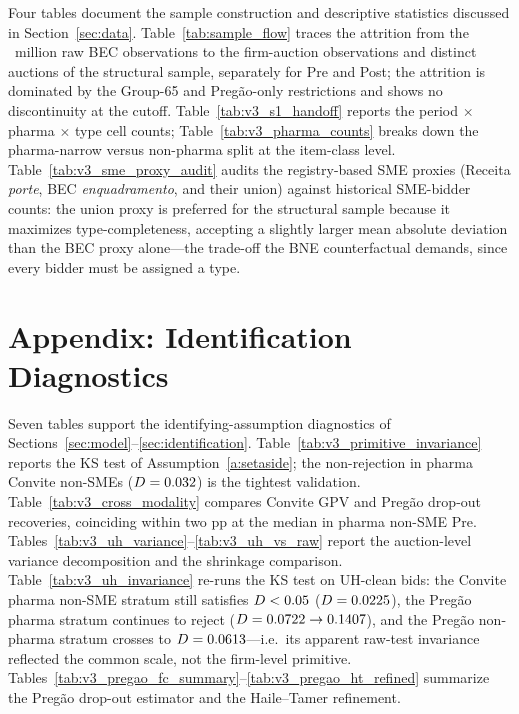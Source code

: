Four tables document the sample construction and descriptive statistics discussed in Section~\ref{sec:data}. Table~\ref{tab:sample_flow} traces the attrition from the \nBidsRaw{}~million raw BEC observations to the \nObsAuctions{} firm-auction observations and \nDistinctAuctions{} distinct auctions of the structural sample, separately for Pre and Post; the attrition is dominated by the Group-65 and Preg\~ao-only restrictions and shows no discontinuity at the \policyCutoffMonth{} cutoff. Table~\ref{tab:v3_s1_handoff} reports the period $\times$ pharma $\times$ type cell counts; Table~\ref{tab:v3_pharma_counts} breaks down the pharma-narrow versus non-pharma split at the item-class level. Table~\ref{tab:v3_sme_proxy_audit} audits the registry-based SME proxies (Receita \emph{porte}, BEC \emph{enquadramento}, and their union) against historical SME-bidder counts: the union proxy is preferred for the structural sample because it maximizes type-completeness, accepting a slightly larger mean absolute deviation than the BEC proxy alone---the trade-off the BNE counterfactual demands, since every bidder must be assigned a type.






\section{Appendix: Identification Diagnostics}\label{app:id}

Seven tables support the identifying-assumption diagnostics of Sections~\ref{sec:model}--\ref{sec:identification}. Table~\ref{tab:v3_primitive_invariance} reports the KS test of Assumption~\ref{a:setaside}; the non-rejection in pharma Convite non-SMEs ($D=0.032$) is the tightest validation. Table~\ref{tab:v3_cross_modality} compares Convite GPV and Preg\~ao drop-out recoveries, coinciding within two pp at the median in pharma non-SME Pre. Tables~\ref{tab:v3_uh_variance}--\ref{tab:v3_uh_vs_raw} report the auction-level variance decomposition and the shrinkage comparison. Table~\ref{tab:v3_uh_invariance} re-runs the KS test on UH-clean bids: the Convite pharma non-SME stratum still satisfies $D < 0.05$ ($D = 0.0225$), the Preg\~ao pharma stratum continues to reject ($D = 0.0722 \to 0.1407$), and the Preg\~ao non-pharma stratum crosses to $D = 0.0613$---i.e.\ its apparent raw-test invariance reflected the common scale, not the firm-level primitive. Tables~\ref{tab:v3_pregao_fc_summary}--\ref{tab:v3_pregao_ht_refined} summarize the Preg\~ao drop-out estimator and the Haile--Tamer refinement.

